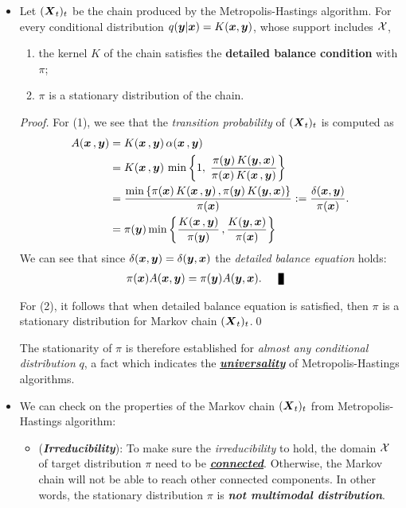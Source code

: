 \documentclass[11pt]{article}
\begin{document}
\begin{itemize}
\item 
\begin{theorem}
Let $(\boldsymbol{X}_t)_t$ be the chain produced by the Metropolis-Hastings algorithm. For every conditional distribution $q(\boldsymbol{y}|\boldsymbol{x}) = K(\boldsymbol{x}, \boldsymbol{y})$, whose support includes ${\mathcal X}$,
\begin{enumerate}
\item the kernel $K$ of the chain satisfies the \textbf{detailed balance condition} with $\pi$;
\item $\pi$ is a stationary distribution of the chain.
\end{enumerate}
\end{theorem}
\begin{proof}
For (1), we see that the \emph{transition probability} of  $(\boldsymbol{X}_t)_t$ is computed as 
\begin{align}
A(\boldsymbol{x}\,, \boldsymbol{y}) &= K(\boldsymbol{x}\,, \boldsymbol{y})\,\alpha(\boldsymbol{x}\,, \boldsymbol{y}) \nonumber\\
&= K(\boldsymbol{x}\,, \boldsymbol{y})\,\min\left\{1, \; \frac{\pi(\boldsymbol{y})\,K(\boldsymbol{y}, \boldsymbol{x})}{\pi(\boldsymbol{x})\,K(\boldsymbol{x}\,, \boldsymbol{y})} \right\}\nonumber\\
&= \frac{\min\left\{\pi(\boldsymbol{x})\,K(\boldsymbol{x}\,, \boldsymbol{y})\,, \pi(\boldsymbol{y})\,K(\boldsymbol{y}, \boldsymbol{x})\right\}}{\pi(\boldsymbol{x})} := \frac{\delta(\boldsymbol{x}, \boldsymbol{y})}{\pi(\boldsymbol{x})}. \label{eqn: mh_transition_prob} \\
&= \pi(\boldsymbol{y})\min\left\{\frac{K(\boldsymbol{x}\,, \boldsymbol{y})}{\pi(\boldsymbol{y})}\,, \frac{K(\boldsymbol{y}, \boldsymbol{x})}{\pi(\boldsymbol{x})}\right\} \nonumber
\end{align}
We can see that since $\delta(\boldsymbol{x}, \boldsymbol{y}) = \delta(\boldsymbol{y}, \boldsymbol{x})$ the \emph{detailed balance equation} holds:
\begin{align}
\pi(\mb{x})A(\mb{x}, \mb{y}) &= \pi(\mb{y})A(\mb{y}, \mb{x}). \qed \label{eqn: mh_detail_balance_equation}
\end{align} 

For (2), it follows that when detailed balance equation is satisfied, then $\pi$ is a stationary distribution for Markov chain $(\boldsymbol{X}_t)_t$.\qed
\end{proof} The stationarity of $\pi$ is therefore established for \emph{almost any conditional distribution} $q$, a fact which indicates the \underline{\emph{\textbf{universality}}} of Metropolis-Hastings algorithms.

\item We can check on the properties of the Markov chain $(\boldsymbol{X}_t)_t$ from Metropolis-Hastings algorithm:
\begin{itemize}
\item (\textbf{\emph{Irreducibility}}): To make sure the \emph{irreducibility} to hold, the domain ${\mathcal X}$ of target distribution $\pi$ need to be \underline{\emph{\textbf{connected}}}. Otherwise, the Markov chain will not be able to reach other connected components. In other words, the stationary distribution $\pi$ is \textbf{\emph{not multimodal distribution}}.


\end{itemize}
\end{itemize}
\end{document}
